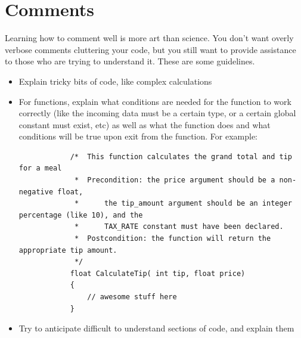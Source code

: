 \documentclass[letterpaper,12pt]{article}
\begin{document}
\section*{Comments}
Learning how to comment well is more art than science. You don't want overly
verbose comments cluttering your code, but you still want to provide assistance to
those who are trying to understand it. These are some guidelines.
\begin{itemize}
    \item Explain tricky bits of code, like complex calculations
    \item For functions, explain what conditions are needed for the function
        to work correctly (like the incoming data must be a certain type, or a 
        certain global constant must exist, etc) as well as what the function does
        and what conditions will be true upon exit from the function. For example:
        \begin{lstlisting}
            /*  This function calculates the grand total and tip for a meal
             *  Precondition: the price argument should be a non-negative float,
             *      the tip_amount argument should be an integer percentage (like 10), and the
             *      TAX_RATE constant must have been declared.
             *  Postcondition: the function will return the appropriate tip amount.
             */
            float CalculateTip( int tip, float price)
            {
                // awesome stuff here
            }
        \end{lstlisting}

    \item Try to anticipate difficult to understand sections of code, and explain them
\end{itemize}
\end{document}
